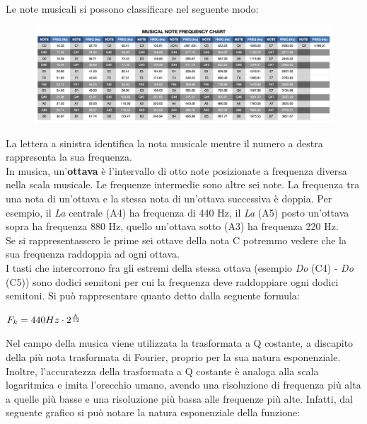 Le note musicali si possono classificare nel seguente modo:
\begin{figure}[H]
	\centering
	\includegraphics[scale=0.15]{./images/img4.jpg}
\end{figure}
\noindent La lettera a sinistra identifica la nota musicale mentre il numero a destra rappresenta la sua frequenza.\\
In musica, un'\textbf{ottava} è l'intervallo di otto note posizionate a frequenza diversa nella scala musicale. Le frequenze intermedie sono altre sei note. La frequenza tra una nota di un'ottava e la stessa nota di un'ottava successiva è doppia. Per esempio, il \textit{La} centrale (A4) ha frequenza di 440 Hz, il \textit{La} (A5) posto un'ottava sopra ha frequenza 880 Hz, quello un'ottava sotto (A3) ha frequenza 220 Hz.\\
Se si rappresentassero le prime sei ottave della nota C potremmo vedere che la sua frequenza raddoppia ad ogni ottava.\\
\newline
I tasti che intercorrono fra gli estremi della stessa ottava (esempio \textit{Do} (C4) - \textit{Do} (C5)) sono dodici semitoni per cui la frequenza deve raddoppiare ogni dodici semitoni. Si può rappresentare quanto detto dalla seguente formula: \\

\begin{center}
	\begin{math}
		F_{k}=440Hz \cdot 2^{k \over 12}
	\end{math}
\end{center}
Nel campo della musica viene utilizzata la trasformata a Q costante, a discapito della più nota trasformata di Fourier, proprio per la sua natura esponenziale. Inoltre, l'accuratezza della trasformata a Q costante è analoga alla scala logaritmica e imita l'orecchio umano, avendo una risoluzione di frequenza più alta a quelle più basse e una risoluzione più bassa alle frequenze più alte. Infatti, dal seguente grafico si può notare la natura esponenziale della funzione:
\begin{center}
\end{center}